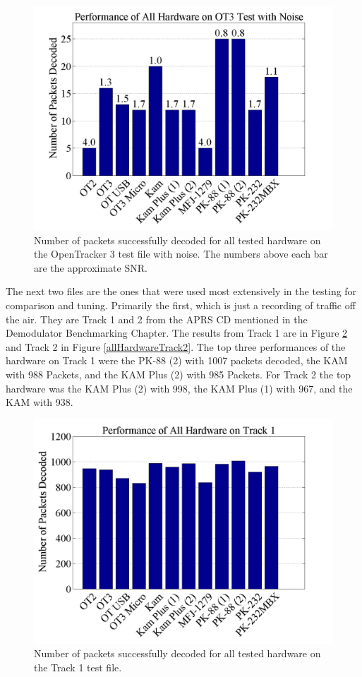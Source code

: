 \begin{figure}
  \centering
	\includegraphics[width=0.75\linewidth]{images/PerformanceofAllHardwareonOT3TestwithNoise.png} 
	\caption{Number of packets successfully decoded for all tested hardware on the OpenTracker 3 test file with noise. The numbers above each bar are the approximate SNR.}
   \label{allHardwareOT3Noise}
\end{figure}

The next two files are the ones that were used most extensively in the testing for comparison and tuning. Primarily the first, which is just a recording of traffic off the air. They are Track 1 and 2 from the APRS CD mentioned in the Demodulator Benchmarking Chapter. The results from Track 1 are in Figure \ref{allHardwareTrack1} and Track 2 in Figure \ref{allHardwareTrack2}. The top three performances of the hardware on Track 1 were the PK-88 (2) with 1007 packets decoded, the KAM with 988 Packets, and the KAM Plus (2) with 985 Packets. For Track 2 the top hardware was the KAM Plus (2) with 998, the KAM Plus (1) with 967, and the KAM with 938.

 \begin{figure}
  \centering
	\includegraphics[width=0.75\linewidth]{images/PerformanceofAllHardwareonTrack1.png} 
	\caption{Number of packets successfully decoded for all tested hardware on the Track 1 test file.}
   \label{allHardwareTrack1}
\end{figure}

